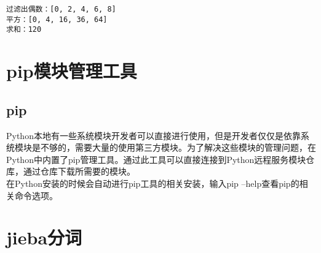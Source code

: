\begin{tcolorbox}
	\begin{verbatim}
过滤出偶数：[0, 2, 4, 6, 8]
平方：[0, 4, 16, 36, 64]
求和：120
\end{verbatim}
\end{tcolorbox}

\newpage

\section{pip模块管理工具}

\subsection{pip}

Python本地有一些系统模块开发者可以直接进行使用，但是开发者仅仅是依靠系统模块是不够的，需要大量的使用第三方模块。为了解决这些模块的管理问题，在Python中内置了pip管理工具。通过此工具可以直接连接到Python远程服务模块仓库，通过仓库下载所需要的模块。\\

在Python安装的时候会自动进行pip工具的相关安装，输入pip --help查看pip的相关命令选项。

\begin{table}[H]
	\centering
	\caption{pip命令}
\end{table}

\newpage

\section{jieba分词}


